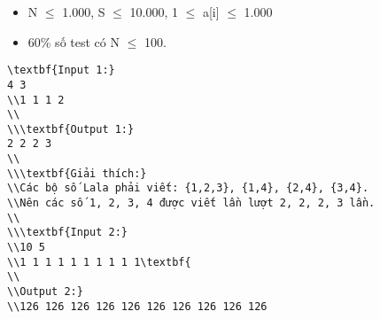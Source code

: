 \begin{itemize}
	\item     N  $\le$  1.000, S  $\le$  10.000, 1 $\le$  a[i]  $\le$  1.000   
	\item     60\% số test có N  $\le$  100.   
\end{itemize}
\begin{verbatim}
\textbf{Input 1:}
4 3
\\1 1 1 2
\\
\\\textbf{Output 1:}
2 2 2 3 
\\
\\\textbf{Giải thích:}
\\Các bộ số Lala phải viết: {1,2,3}, {1,4}, {2,4}, {3,4}. 
\\Nên các số 1, 2, 3, 4 được viết lần lượt 2, 2, 2, 3 lần.
\\
\\\textbf{Input 2:}
\\10 5
\\1 1 1 1 1 1 1 1 1 1\textbf{
\\
\\Output 2:}
\\126 126 126 126 126 126 126 126 126 126 \end{verbatim}